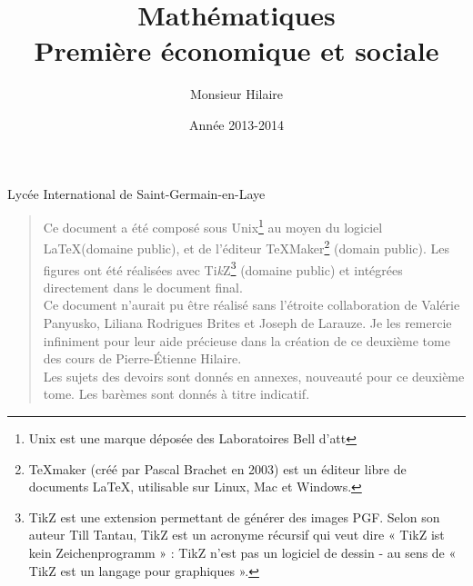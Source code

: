 %

   	 
	
\usepackage[T1]{fontenc} 
\usepackage[a4paper,left=2cm,right=2cm,top=2cm,bottom=2cm]{geometry} 
\usepackage{lmodern} 
\usepackage{graphicx} 
\usepackage[french]{babel} 
\usepackage{fancyhdr}


\usepackage{textcomp}
\usepackage{texgraph}
\usepackage{pgf,tikz}
\usetikzlibrary{arrows}

\usepackage{variations}


\title {  \Huge     Mathématiques\\
             Première économique et sociale \\
       }

\author{ \Large   Monsieur Hilaire  }

\date  { \large  Année 2013-2014   }





\maketitle\thispagestyle{empty} %
\vfill

\centerline {\large  Lycée International de Saint-Germain-en-Laye} 

\newpage

\thispagestyle{empty}

\def\TikZ{{\fontfamily{cmr}Ti{\em k}Z}} 
    \begin {quote}
    Ce document a été composé sous  Unix\footnote{Unix  est une
    marque déposée des  Laboratoires  Bell d'{\sc att}} au moyen  
    du logiciel \LaTeX (domaine  public),
    et de l'éditeur {\TeX}{Maker}\footnote{TeXmaker (créé par Pascal Brachet en 2003) est un éditeur libre de documents LaTeX, utilisable sur Linux, Mac et Windows.} (domain public). 
    Les figures ont été réalisées avec {\TikZ}\footnote{TikZ est une extension permettant de générer des images PGF. Selon son auteur Till Tantau, TikZ est un acronyme récursif qui veut dire « TikZ ist kein Zeichenprogramm » : TikZ n'est pas un logiciel de dessin - au sens de « TikZ est un langage pour graphiques ».} (domaine
   public)  et  intégrées  directement  dans le  document  final. \\
   
   Ce document n'aurait pu être réalisé sans l'étroite collaboration de Valérie Panyusko, Liliana Rodrigues Brites et Joseph de Larauze. Je les remercie infiniment pour leur aide précieuse dans la création de ce deuxième tome des cours de Pierre-Étienne Hilaire. \\
   
   Les sujets des devoirs sont donnés en annexes, nouveauté pour ce deuxième tome. Les barèmes sont donnés à titre indicatif. \\
   
    \end {quote}

